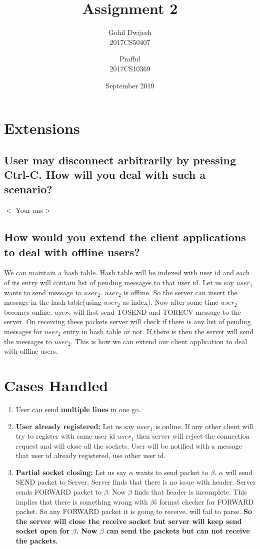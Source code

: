 \documentclass{article}
\title{Assignment 2}
\author{Gohil Dwijesh \\ 2017CS50407
        \and Prafful \\ 2017CS10369}
\date{September 2019}
\begin{document}
\maketitle
\section{Extensions}
    \subsection{User may disconnect arbitrarily by pressing Ctrl-C. How will you deal with such a scenario?}
        $<$ Your ans$>$
    \subsection{How would you extend the client applications to deal with offline users?}
    We can maintain a hash table. Hash table will be indexed with user id and each of its entry will contain list of pending messages to that user id. Let us say $user_{1}$ wants to send message to $user_{2}$. $user_{2}$ is offline. So the server can insert the message in the hash table(using $user_{2}$ as index). Now after some time $user_{2}$ becomes online. $user_{2}$ will first send TOSEND and TORECV message to the server. On receiving these packets server will check if there is any list of pending messages for $user_{2}$ entry in hash table or not. If there is then the server will send the messages to $user_{2}$. This is how we can extend our client application to deal with offline users.
\section{Cases Handled}
\begin{enumerate}
    \item User can send \textbf{multiple lines} in one go.
    \item \textbf{User already registered:} Let us say $user_{1}$ is online. If any other client will try to register with same user id $user_{1}$ then server will reject the connection request and will close all the sockets. User will be notified with a message that user id already registered, use other user id.
    \item \textbf{Partial socket closing:} Let us say $\alpha$ wants to send packet to $\beta$. $\alpha$ will send SEND packet to Server. Server finds that there is no issue with header. Server sends FORWARD packet to $\beta$. Now $\beta$ finds that header is incomplete. This implies that there is something wrong with $\beta$\'s format checker for FORWARD packet. So any FORWARD packet it is going to receive, will fail to parse. \textbf{So the server will close the receive socket but server will keep send socket open for $\beta$. Now $\beta$ can send the packets but can not receive the packets.}
\end{enumerate}{}
\end{document}
